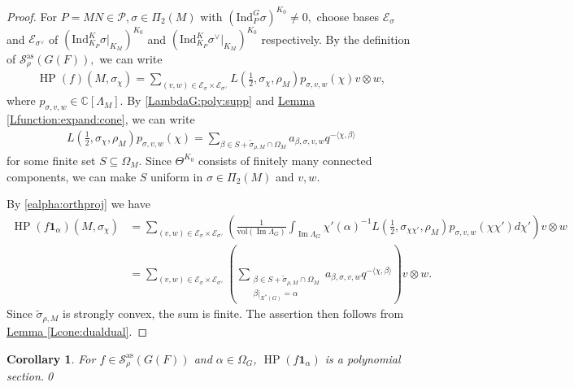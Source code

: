 \documentclass[10pt]{amsart}
\newtheorem{corollary}{Corollary}[theorem]
\theoremstyle{definition}
\numberwithin{equation}{section}
\numberwithin{equation}{subsection}
\newcommand{\Ind}{\mathrm{Ind}}
\renewcommand{\Im}{\mathop{\mathrm{Im}}}
\newcommand{\HP}{\mathop{\mathrm{HP}}\nolimits}
\begin{document}
\begin{proof} 
 For $P=MN\in \mathcal{P}, \sigma\in\Pi_2(M)$ with $(\mathrm{Ind}_P^G \sigma)^{K_0}\neq 0,$ choose bases $\mathcal{E}_\sigma$ and $\mathcal{E}_{\sigma^\vee}$ of $(\Ind_{K_P}^K\sigma\vert_{K_M})^{K_0}$ and $(\Ind_{K_P}^K\sigma^\vee\vert_{K_M})^{K_0}$ respectively. By the definition of $\mathcal{S}_\rho^{\mathrm{as}}(G(F)),$ we can write
\begin{align*}
    \HP(f)(M,\sigma_\chi) = \sum_{(v,w)\in \mathcal{E}_\sigma\times \mathcal{E}_{\sigma^\lor}} L(\tfrac{1}{2},\sigma_\chi,\rho_M) p_{\sigma,v,w}(\chi) v\otimes w,
\end{align*}
where $p_{\sigma,v,w}\in \mathbb{C}[\Lambda_M]$. By \eqref{LambdaG:poly:supp} and \hyperref[Lfunction:expand:cone]{Lemma \ref{Lfunction:expand:cone}}, we can write
\begin{align*}
    L(\tfrac{1}{2},\sigma_\chi,\rho_M) p_{\sigma,v,w}(\chi) = \sum_{\beta\in S + \widetilde{\sigma}_{\rho,M}\cap\Omega_M} a_{\beta,\sigma,v,w}q^{-\langle\chi,\beta\rangle}
\end{align*}
for some finite set $S\subseteq\Omega_M.$ Since $\Theta^{K_0}$ consists of finitely many connected components, we can make $S$ uniform in $\sigma\in\Pi_2(M)$ and $v,w$.

 By \eqref{ealpha:orthproj} we have
\begin{align*}
      \HP(f\mathbf{1}_\alpha)(M,\sigma_\chi) &= \sum_{(v,w)\in \mathcal{E}_\sigma\times\mathcal{E}_{\sigma^\lor}} \left(\frac{1}{\mathrm{vol}(\Im\Lambda_G)}\int_{\Im \Lambda_G} \chi'(\alpha)^{-1}L(\tfrac{1}{2},\sigma_{\chi\chi'},\rho_M) p_{\sigma,v,w}(\chi\chi')d\chi'\right)v\otimes w\\
     &=\sum_{(v,w)\in \mathcal{E}_\sigma\times\mathcal{E}_{\sigma^\lor}} \left(\sum\limits_{\substack{\beta\in S+\widetilde{\sigma}_{\rho,M}\cap\Omega_M\\\beta\vert_{X^*(G)} = \alpha}}a_{\beta,\sigma,v,w}q^{-\langle\chi,\beta\rangle}\right)v\otimes w.
\end{align*}
Since $\widetilde{\sigma}_{\rho,M}$ is strongly convex, the sum is finite. The assertion then follows from \hyperref[Lcone:dualdual]{Lemma \ref{Lcone:dualdual}}.
\end{proof}

\begin{corollary}
    For $f\in \mathcal{S}^{\mathrm{as}}_\rho(G(F))$ and $\alpha\in \Omega_G$,  $\HP(f\mathbf{1}_\alpha)$ is a polynomial section.\qed
\end{corollary}
\end{document}
